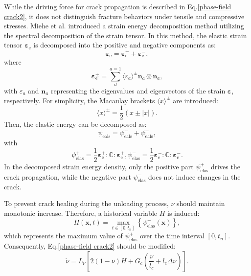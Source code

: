 \documentclass[final,times,fleqn,11pt]{elsarticle}
\begin{document}
While the driving force for crack propagation is described in Eq.\eqref{phase-field crack2}, it does not distinguish fracture behaviors under tensile and compressive stresses. Miehe et al. \cite{miehe_thermodynamically_2010} introduced a strain energy decomposition method utilizing the spectral decomposition of the strain tensor. In this method, the elastic strain tensor $\mathbf{\varepsilon}_\mathrm{e}$ is decomposed into the positive and negative components as:
\begin{equation}
    \mathbf{\varepsilon}_\mathrm{e}=\mathbf{\varepsilon}^+_\mathrm{e} + \mathbf{\varepsilon}^-_\mathrm{e}  ,
\end{equation}
where 
\begin{equation}
    \mathbf{\varepsilon}_\mathrm{e}^\pm=\sum_{d}^{a=1}\langle \varepsilon_a\rangle^\pm \mathbf{n}_a\otimes\mathbf{n}_a,
\end{equation}
with $\varepsilon_a$ and $\mathbf{n}_a$ representing the eigenvalues and eigenvectors of the strain $\mathbf{\varepsilon}$, respectively. For simplicity, the Macaulay brackets $\langle x \rangle^\pm$ are introduced: 
\begin{equation}
    \langle x \rangle^\pm = \frac{1}{2}(x\pm |x|).
\end{equation}
Then, the elastic energy can be decomposed as:
\begin{equation}
    \psi_\mathrm{eals}=\psi_\mathrm{eals}^++\psi_\mathrm{eals}^-,
\end{equation}
with 
\begin{subequations}
    \begin{equation}
        \psi^+_\mathrm{elas}=\frac{1}{2}\mathbf{\varepsilon}_\mathrm{e}^+ : \mathbb{C} : \mathbf{\varepsilon}_\mathrm{e}^+,
    \end{equation}
    \begin{equation}
        \psi^-_\mathrm{elas}=\frac{1}{2}\mathbf{\varepsilon}_\mathrm{e}^- : \mathbb{C} : \mathbf{\varepsilon}_\mathrm{e}^-.
    \end{equation}
\end{subequations}
In the decomposed strain energy density, only the positive part $\psi^+_\mathrm{elas}$ drives the crack propagation, while the negative part $\psi^-_\mathrm{elas}$ does not induce changes in the crack. 

To prevent crack healing during the unloading process, $\nu$ should maintain monotonic increase. Therefore, a historical variable $H$ is induced:
\begin{equation}
    H(\mathbf{x},t)=\max_{t\in [0,t_n]} \left\{  \psi^+_\mathrm{elas}(\mathbf{x})\right\},
\end{equation}
which represents the maximum value of $\psi^+_\mathrm{elas}$ over the time interval $[0,t_n]$. Consequently, Eq.\eqref{phase-field crack2} should be modified:
\begin{equation}
    \dot{\nu}=L_\nu\left[ 2(1-\nu)H+G_c\left(\frac{\nu}{l_c} + l_c\Delta \nu\right) \right].
\end{equation}
\end{document}
